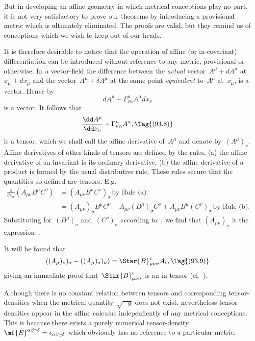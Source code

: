 \documentclass[12pt]{book}
\begin{document}
But in developing an affine geometry in which metrical conceptions play no part, it is not very satisfactory
to prove our theorems by introducing a provisional metric which is ultimately eliminated.
The proofs are valid, but they remind us of conceptions which we wish to keep out of our heads.

It is therefore desirable to notice that the operation of affine (or in\hyp{}covariant) differentiation can be
introduced without reference to any metric, provisional or otherwise.
In a vector\hyp{}field the difference between the \emph{actual} vector~$A^\mu + dA^\mu$ at~$x_\mu+dx_\mu$
and the vector~$A^\mu+\delta A^\mu$ at the same point \emph{equivalent} to~$A^\mu$ at~$x_\mu$, is a vector.
Hence by~
\[
dA^\mu + \Gamma^\mu_{\nu\alpha} A^\alpha dx_\nu
\]
is a vector.
It follows that
\[
\frac{\dd A^\mu}{\dd x_\nu} + \Gamma^\mu_{\nu\alpha}A^\alpha,
\Tag{(93.8)}
\]
is a tensor, which we shall call the affine derivative of~$A^\mu$ and denote by~$(A^\mu)_\nu$.
Affine derivatives of other kinds of tensors are defined by the rules,
(a) the affine derivative of an invariant is its ordinary derivative,
(b) the affine derivative of a product is formed by the usual distributive rule.
These rules secure that the quantities so defined are tensors. E.g.
\begin{align*}
\frac{\dd}{\dd x_\sigma}(A_{\mu\nu} B^\mu C^\nu) & = (A_{\mu\nu} B^\mu C^\nu)_\sigma \, \text{by Rule (a)}\\
 & = (A_{\mu\nu})_\sigma B^\mu C^\nu + A_{\mu\nu} (B^\mu)_\sigma C^\nu + A_{\mu\nu} B^\mu (C^\nu)_\sigma \, \text{by Rule (b)}.
\end{align*}
Substituting for~$(B^\mu)_\sigma$ and~$(C^\nu)_\sigma$ according to~,
we find that $(A_{\mu\nu})_\sigma$ is the expression~.

It will be found that
\[
((A_\mu)_\nu)_\sigma - ((A_\mu)_\sigma)_\nu) = \Star{B}^\epsilon_{\mu\nu\sigma}A_\epsilon,
\Tag{(93.9)}
\]
giving an immediate proof that~$\Star{B}^\epsilon_{\mu\nu\sigma}$ is an in-tensor (cf.~).

Although there is no constant relation between tensors and corresponding tensor\hyp{}densities when the
metrical quantity~$\sqrt{-g}$ does not exist, nevertheless tensor\hyp{}densities appear in the affine calculus
indepenfiently of any metrical conceptions.
This is because there exists a purely numerical
tensor\hyp{}density~$\mf{E}^{\alpha\beta\gamma\delta}=\epsilon_{\alpha\beta\gamma\delta}$  which
obviously has no reference to a particular metric.
\end{document}
